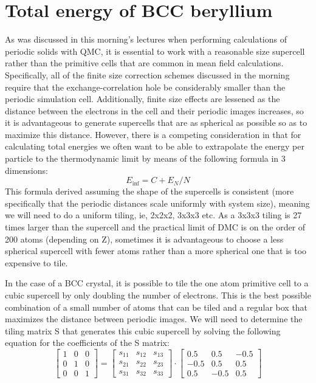\section{Total energy of BCC beryllium}

As was discussed in this morning’s lectures when performing calculations of periodic solids with QMC, it is essential to work with a reasonable size supercell rather than the primitive cells that are common in mean field calculations.  Specifically, all of the finite size correction schemes discussed in the morning require that the exchange-correlation hole be considerably smaller than the periodic simulation cell.  Additionally, finite size effects are lessened as the distance between the electrons in the cell and their periodic images increases, so it is advantageous to generate supercells that are as spherical as possible so as to maximize this distance.  However, there is a competing consideration in that for calculating total energies we often want to be able to extrapolate the energy per particle to the thermodynamic limit by means of the following formula in 3 dimensions:
\begin{equation}
E_{\inf} = C + E_{N}/N
\end{equation}
This formula derived assuming the shape of the supercells is consistent (more specifically that the periodic distances scale uniformly with system size), meaning we will need to do a uniform tiling, ie, 2x2x2, 3x3x3 etc.  As a 3x3x3 tiling is 27 times larger than the supercell and the practical limit of DMC is on the order of 200 atoms (depending on Z), sometimes it is advantageous to choose a less spherical supercell with fewer atoms rather than a more spherical one that is too expensive to tile.

In the case of a BCC crystal, it is possible to tile the one atom primitive cell to a cubic supercell by only doubling the number of electrons.  This is the best possible combination of a small number of atoms that can be tiled and a regular box that maximizes the distance between periodic images.  We will need to determine the tiling matrix S that generates this cubic supercell by solving the following equation for the coefficients of the S matrix:
\begin{equation}
 \left[\begin{array}{rrr}
  1 & 0 & 0 \\
  0 & 1 & 0 \\
  0 & 0 & 1 
  \end{array}\right] =  \left[\begin{array}{rrr}
  s_{11} & s_{12} & s_{13} \\
  s_{21} & s_{22} & s_{23} \\
  s_{31} & s_{32} & s_{33} 
  \end{array}\right] \cdot 
\left[\begin{array}{rrr}
  0.5 &  0.5 & -0.5 \\
 -0.5 &  0.5 &  0.5 \\
  0.5 & -0.5 &  0.5
\end{array}\right] 
\end{equation}

